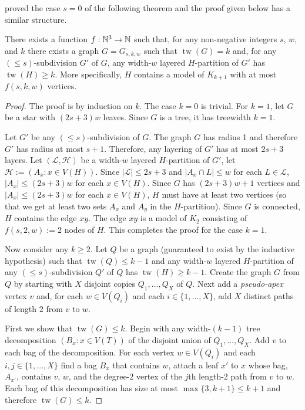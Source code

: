 \documentclass[kpfonts]{patmorin}
\DeclareMathOperator{\tw}{tw}
\begin{document}
\citet{dujmovic.joret.ea:planar} proved the case $s=0$ of the following theorem and the proof given below has a similar structure.

\begin{thm}\label{LayeredPartitionSubdivision}
  There exists a function $f:\mathbb{N}^3\to\mathbb{N}$ such that, for any non-negative integers $s$, $w$, and $k$ there exists a graph $G=G_{s,k,w}$ such that $\tw(G)=k$ and, for any $(\le\!\!s)$-subdivision $G'$ of $G$, any width-$w$ layered $H$-partition of $G'$ has $\tw(H) \ge k$.  More specifically, $H$ contains a model of $K_{k+1}$ with at most $f(s, k, w)$ vertices.
\end{thm}

\begin{proof}
  The proof is by induction on $k$.  The case $k=0$ is trivial.  For $k=1$, let $G$ be a star with $(2s+3)w$ leaves.  Since $G$ is a tree, it has treewidth $k=1$.

  Let $G'$ be any $(\le\!\!s)$-subdivision of $G$.  The graph $G$ has radius 1 and therefore $G'$ has radius at most $s+1$.  Therefore, any layering of $G'$ has at most $2s+3$ layers.  Let $(\mathcal{L},\mathcal{H})$ be a width-$w$ layered $H$-partition of $G'$, let $\mathcal{H}:=(A_x:x\in V(H))$.  Since $|\mathcal{L}|\le 2s+3$ and $|A_x\cap L|\le w$ for each $L\in\mathcal{L}$, $|A_x|\le (2s+3)w$ for each $x\in V(H)$.  Since $G$ has $(2s+3)w+1$ vertices and $|A_x|\le (2s+3)w$ for each $x\in V(H)$, $H$ must have at least two vertices (so that we get at least two sets $A_x$ and $A_y$ in the $H$-partition).  Since $G$ is connected, $H$ contains the edge $xy$.  The edge $xy$ is a model of $K_2$ consisting of $f(s,2,w):=2$ nodes of $H$.  This completes the proof for the case $k=1$.

  Now consider any $k\ge 2$.  Let $Q$ be a graph (guaranteed to exist by the inductive hypothesis) such that $\tw(Q)\le k-1$ and any width-$w$ layered $H$-partition of any $(\le\!\!s)$-subdivision $Q'$ of $Q$ has $\tw(H)\ge k-1$.  Create the graph $G$ from $Q$ by starting with $X$ disjoint copies $Q_1,\ldots,Q_X$ of $Q$.  Next add a \emph{pseudo-apex} vertex $v$ and, for each $w\in V(Q_i)$ and each $i\in\{1,\ldots,X\}$, add $X$ distinct paths of length $2$ from $v$ to $w$.

  First we show that $\tw(G)\le k$.  Begin with any width-$(k-1)$ tree decomposition $(B_x:x\in V(T))$ of the disjoint union of $Q_1,\ldots,Q_X$.  Add $v$ to each bag of the decomposition.  For each vertex $w\in V(Q_i)$ and each $i,j\in\{1,\ldots,X\}$ find a bag $B_x$ that contains $w$, attach a leaf $x'$ to $x$ whose bag, $A_{x'}$, contains $v$, $w$, and the degree-2 vertex of the $j$th length-2 path from $v$ to $w$.  Each bag of this decomposition has size at most $\max\{3,k+1\}\le k+1$ and therefore $\tw(G)\le k$.


\end{proof}
\end{document}
